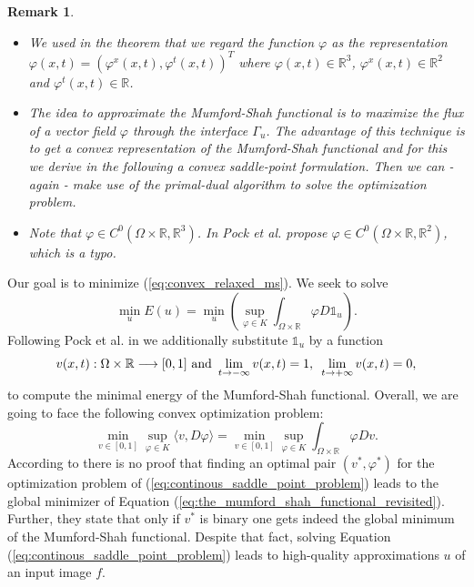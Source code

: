 \documentclass[abstracton]{scrreprt}
\newtheorem{remark}[theorem]{Remark}
\begin{document}
        \begin{remark}
            \begin{itemize}
                \item We used in the theorem that we regard the function $\varphi$ as the representation $\varphi(x, t) = \left( \varphi^{x}(x,t), \varphi^{t}(x,t) \right)^{T}$ where $\varphi(x,t) \in \mathbb{R}^{3}$, $\varphi^{x}(x,t) \in \mathbb{R}^{2}$ and $\varphi^{t}(x,t) \in \mathbb{R}$.
                \item The idea to approximate the Mumford-Shah functional is to maximize the flux of a vector field $\varphi$ through the interface $\Gamma_{u}$. The advantage of this technique is to get a convex representation of the Mumford-Shah functional and for this we derive in the following a convex saddle-point formulation. Then we can - again - make use of the primal-dual algorithm to solve the optimization problem.
                \item Note that $\varphi \in C^{0}(\Omega \times \mathbb{R}, \mathbb{R}^{3})$. In \cite{Pock-et-al-iccv09} Pock et al. propose $\varphi \in C^{0}(\Omega \times \mathbb{R}, \mathbb{R}^{2})$, which is a typo.
            \end{itemize}
        \end{remark}
        Our goal is to minimize (\ref{eq:convex_relaxed_ms}). We seek to solve
            $$
                \min_{u} E(u) = \min_{u} \left( \sup_{\varphi \in K} \int_{\Omega \times \mathbb{R}} \varphi D\mathds{1}_{u} \right).
            $$
        Following Pock et al. in \cite{Pock-et-al-iccv09} we additionally substitute $\mathds{1}_{u}$ by a function
            \begin{equation}
                v(x, t): \Omega \times \mathbb{R} \longrightarrow [0, 1] \,\, \textnormal{and} \,\, \lim_{t \rightarrow -\infty} v(x, t) = 1, \, \, \, \lim_{t \rightarrow +\infty} v(x, t) = 0,
            \label{eq:generic_functions}
            \end{equation}
        to compute the minimal energy of the Mumford-Shah functional. Overall, we are going to face the following convex optimization problem:
            \begin{equation}
                \min_{v \in [0, 1]} \sup_{\varphi \in K} \langle v, D\varphi \rangle = \min_{v \in [0, 1]} \sup_{\varphi \in K} \int_{\Omega \times \mathbb{R}} \varphi Dv.
                \label{eq:continous_saddle_point_problem}
            \end{equation}
        According to \cite{Pock-et-al-iccv09} there is no proof that finding an optimal pair $(v^{\ast}, \varphi^{\ast})$ for the optimization problem of (\ref{eq:continous_saddle_point_problem}) leads to the global minimizer of Equation (\ref{eq:the_mumford_shah_functional_revisited}). Further, they state that only if $v^{\ast}$ is binary one gets indeed the global minimum of the Mumford-Shah functional. Despite that fact, solving Equation (\ref{eq:continous_saddle_point_problem}) leads to high-quality approximations $u$ of an input image $f$.
\end{document}

